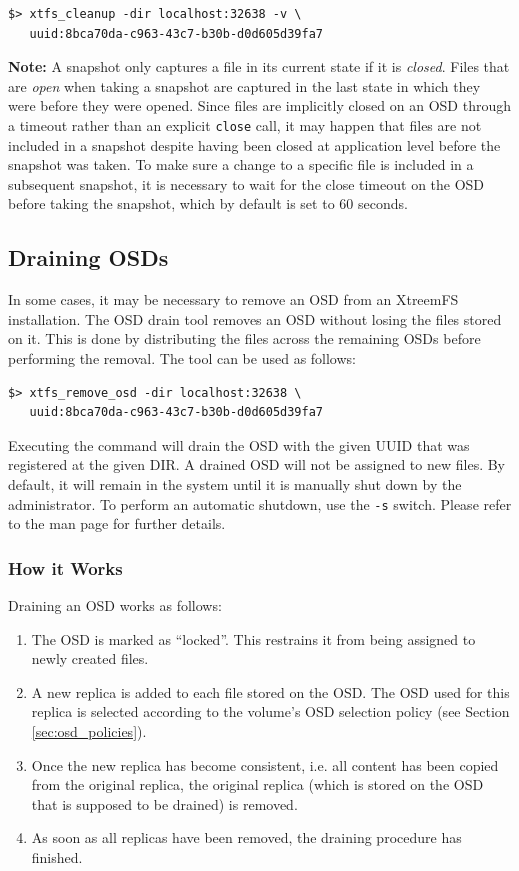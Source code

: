 \documentclass[a4paper,10pt]{book}
\begin{document}
\begin{verbatim}
$> xtfs_cleanup -dir localhost:32638 -v \
   uuid:8bca70da-c963-43c7-b30b-d0d605d39fa7
\end{verbatim}

\textbf{Note:} A snapshot only captures a file in its current state if it is \emph{closed}. Files that are \emph{open} when taking a snapshot are captured in the last state in which they were before they were opened. Since files are implicitly closed on an OSD through a timeout rather than an explicit \texttt{close} call, it may happen that files are not included in a snapshot despite having been closed at application level before the snapshot was taken. To make sure a change to a specific file is included in a subsequent snapshot, it is necessary to wait for the close timeout on the OSD before taking the snapshot, which by default is set to 60 seconds.

\subsection{Draining OSDs}

In some cases, it may be necessary to remove an OSD from an XtreemFS installation. The OSD drain tool removes an OSD without losing the files stored on it. This is done by distributing the files across the remaining OSDs before performing the removal. The tool can be used as follows:

\begin{verbatim}
$> xtfs_remove_osd -dir localhost:32638 \
   uuid:8bca70da-c963-43c7-b30b-d0d605d39fa7
\end{verbatim}

Executing the command will drain the OSD with the given UUID that was registered at the given DIR. A drained OSD will not be assigned to new files. By default, it will remain in the system until it is manually shut down by the administrator. To perform an automatic shutdown, use the \texttt{-s} switch. Please refer to the man page for further details.

\subsubsection{How it Works}

Draining an OSD works as follows:
\begin{enumerate}
 \item The OSD is marked as ``locked''. This restrains it from being assigned to newly created files.
 \item A new replica is added to each file stored on the OSD. The OSD used for this replica is selected according to the volume's OSD selection policy (see Section \ref{sec:osd_policies}).
 \item Once the new replica has become consistent, i.e. all content has been copied from the original replica, the original replica (which is stored on the OSD that is supposed to be drained) is removed.
 \item As soon as all replicas have been removed, the draining procedure has finished. 
\end{enumerate}
\end{document}
